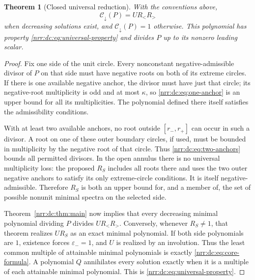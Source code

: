 \documentclass[11pt,letterpaper]{article}
\newtheorem{theorem}{Theorem}[section]
\theoremstyle{definition}
\theoremstyle{remark}
\newcommand{\dcore}{\mathcal C_{\downarrow}}
\begin{document}
\begin{theorem}[Closed universal reduction]
\label{nrr:dc:thm:core}
With the conventions above,
\begin{equation}
 \boxed{\ \dcore(P)=U R_<R_>\ }
 \label{nrr:dc:eq:core-formula}
\end{equation}
when decreasing solutions exist, and $\dcore(P)=1$ otherwise.
This polynomial has property \eqref{nrr:dc:eq:universal-property} and
divides $P$ up to its nonzero leading scalar.
\end{theorem}
\begin{proof}
Fix one side of the unit circle. Every nonconstant negative-admissible
divisor of $P$ on that side must have negative roots on both of its
extreme circles. If there is one available negative anchor, the divisor
must have just that circle; its negative-root multiplicity is odd and
at most $\kappa$, so \eqref{nrr:dc:eq:one-anchor} is an upper bound for all
its multiplicities. The polynomial defined there itself satisfies the
admissibility conditions.

With at least two available anchors, no root outside
$[r_-,r_+]$ can occur in such a divisor. A root on one of these outer
boundary circles, if used, must be bounded in multiplicity by the
negative root of that circle. Thus \eqref{nrr:dc:eq:two-anchors} bounds all
permitted divisors. In the open annulus there is no universal
multiplicity loss: the proposed $R_S$ includes all roots there and
uses the two outer negative anchors to satisfy its only extreme-circle
conditions. It is itself negative-admissible. Therefore $R_S$ is both
an upper bound for, and a member of, the set of possible nonunit
minimal spectra on the selected side.

Theorem~\ref{nrr:dc:thm:main} now implies that every decreasing
minimal polynomial dividing $P$ divides $UR_<R_>$. Conversely,
whenever $R_S\ne1$, that theorem realizes $UR_S$ as an exact minimal
polynomial. If both side polynomials are $1$, existence forces
$\varepsilon_-=1$, and $U$ is realized by an involution. Thus the least common
multiple of attainable minimal polynomials is exactly
\eqref{nrr:dc:eq:core-formula}.
A polynomial $Q$ annihilates every solution exactly when it is a
multiple of each attainable minimal polynomial. This is
\eqref{nrr:dc:eq:universal-property}.
\end{proof}
\end{document}
